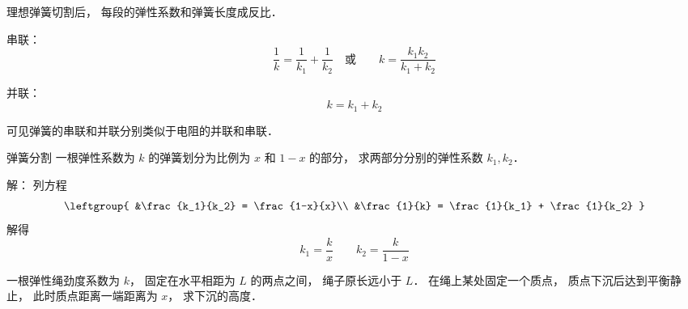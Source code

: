 
\begin{issues}
\issueDraft
\end{issues}


理想弹簧切割后， 每段的弹性系数和弹簧长度成反比．

串联：
\begin{equation}
\frac{1}{k} = \frac{1}{k_1} + \frac{1}{k_2}
\quad \text{或} \qquad
k = \frac{k_1 k_2}{k_1 + k_2}
\end{equation}

并联：
\begin{equation}
k = k_1 + k_2
\end{equation}

可见弹簧的串联和并联分别类似于电阻的并联和串联．


\begin{example}{弹簧分割}
一根弹性系数为 $k$ 的弹簧划分为比例为 $x$ 和 $1-x$ 的部分， 求两部分分别的弹性系数 $k_1, k_2$．

解： 列方程
\begin{equation}
\leftgroup{
&\frac{k_1}{k_2} = \frac{1-x}{x}\\
&\frac{1}{k} = \frac{1}{k_1} + \frac{1}{k_2}
}
\end{equation}
解得
\begin{equation}
k_1 = \frac{k}{x} \qquad k_2 = \frac{k}{1-x}
\end{equation}
\end{example}

\begin{example}{}
一根弹性绳劲度系数为 $k$， 固定在水平相距为 $L$ 的两点之间， 绳子原长远小于 $L$． 在绳上某处固定一个质点， 质点下沉后达到平衡静止， 此时质点距离一端距离为 $x$， 求下沉的高度．
\end{example}
